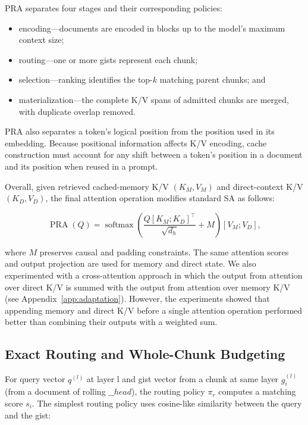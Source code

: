 \documentclass[11pt]{article}
\begin{document}
PRA separates four stages and their corresponding policies:

\begin{itemize}
  \item encoding---documents are encoded in blocks up to the model's maximum context size;
  \item routing---one or more gists represent each chunk;
  \item selection---ranking identifies the top-$k$ matching parent chunks; and
  \item materialization---the complete K/V spans of admitted chunks are merged, with
  duplicate overlap removed.
\end{itemize}

PRA also separates a token's logical position from the position used in its embedding.
Because positional information affects K/V encoding, cache construction must account for
any shift between a token's position in a document and its position when reused in a prompt.


Overall, given retrieved cached-memory K/V $(K_M,V_M)$ and direct-context K/V
$(K_D,V_D)$, the final attention operation modifies standard SA as follows:

\begin{equation}
  \operatorname{PRA}(Q)=
  \operatorname{softmax}\!\left(
  \frac{Q[K_M;K_D]^\top}{\sqrt{d_h}} + M
  \right)[V_M;V_D],
  \label{eq:pra-attention}
\end{equation}

\noindent where $M$ preserves causal and padding constraints.
The same attention scores and output projection are used for memory and direct state.
We also experimented with a cross-attention approach in which the output from attention
over direct K/V is summed with the output from attention over memory K/V
(see Appendix~\ref{app:adaptation}). However, the experiments showed that appending memory
and direct K/V before a single attention operation performed better than combining their
outputs with a weighted sum.


\subsection{Exact Routing and Whole-Chunk Budgeting}

For query vector $q^{(l)}$ at layer l and gist vector from a chunk at same layer $g_i^{(l)}$ 
(from a document of rolling $\_\_head$), the routing policy $\pi_r$ computes a matching score
$s_i$. The simplest routing policy uses cosine-like similarity between the query and the gist:
\end{document}

